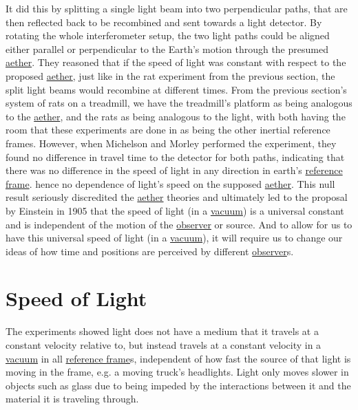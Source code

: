 It did this by splitting a single light beam into two perpendicular paths, that are then reflected back to be recombined and sent towards a light detector. By rotating the whole interferometer setup, the two light paths could be aligned either parallel or perpendicular to the Earth’s motion through the presumed \hyperlink{def-aether}{aether}.
They reasoned that if the speed of light was constant with respect to the proposed \hyperlink{def-aether}{aether}, just like in the rat experiment from the previous section, the split light beams would recombine at different times. From the previous section's system of rats on a treadmill, we have the treadmill's platform as being analogous to the \hyperlink{def-aether}{aether}, and the rats as being analogous to the light, with both having the room that these experiments are done in as being the other inertial reference frames.
However, when Michelson and Morley performed the experiment, they found no difference in travel time to the detector for both paths, indicating that there was no difference in the speed of light in any direction in earth's \hyperlink{def-Reference-frame}{reference frame}. hence no dependence of light's speed on the supposed \hyperlink{def-aether}{aether}. This null result seriously discredited the \hyperlink{def-aether}{aether} theories and ultimately led to the proposal by Einstein in 1905 that the speed of light (in a \hyperlink{def-vacuum}{vacuum}) is a universal constant and is independent of the motion of the \hyperlink{def-observer}{observer} or source. And to allow for us to have this universal speed of light (in a \hyperlink{def-vacuum}{vacuum}), it will require us to change our ideas of how time and positions are perceived by different \hyperlink{def-observer}{observer}s.

\section{Speed of Light}%

The experiments showed light does not have a medium that it travels at a constant velocity relative to, but instead travels at a constant velocity in a \hyperlink{def-vacuum}{vacuum} in all \hyperlink{def-Reference-frame}{reference frame}s, independent of how fast the source of that light is moving in the frame, e.g. a moving truck's headlights. Light only moves slower in objects such as glass due to being impeded by the interactions between it and the material it is traveling through.

